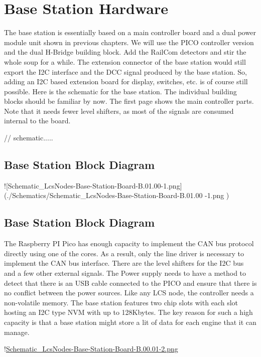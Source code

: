 \chapter{Base Station Hardware}

The base station is essentially based on a main controller board and a dual power module unit shown in previous chapters. We will use the PICO controller version and the dual H-Bridge building block. Add the RailCom detectors and stir the whole soup for a while. The extension connector of the base station would still export the I2C interface and the DCC signal produced by the base station. So, adding an I2C based extension board for display, switches, etc. is of course still possible. Here is the schematic for the base station. The individual building blocks should be familiar by now. The first page shows the main controller parts. Note that it needs fewer level shifters, as most of the signals are consumed internal to the board.

// schematic.....

\section{Base Station Block Diagram}

![Schematic_LcsNodes-Base-Station-Board-B.01.00-1.png](./Schematics/Schematic_LcsNodes-Base-Station-Board-B.01.00
-1.png )

\section{Base Station Block Diagram}

The Raspberry PI Pico has enough capacity to implement the CAN bus protocol directly using one of the cores. As a result, only the line driver is necessary to implement the CAN bus interface. There are the level shifters for the I2C bus and a few other external signals. The Power supply needs to have a method to detect that there is an USB cable connected to the PICO and ensure that there is no conflict between the power sources. Like any LCS node, the controller needs a non-volatile memory. The base station features two chip slots with each slot hosting an I2C type NVM with up to 128Kbytes. The key reason for such a high capacity is that a base station might store a lit of data for each engine that it can manage.

!\href{./Schematics/Schematic_LcsNodes-Base-Station-Board-B.01.00-2.png }{Schematic_LcsNodes-Base-Station-Board-B.00.01-2.png}

